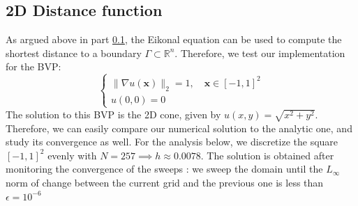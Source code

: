 \documentclass[11pt]{article}
\theoremstyle{definition}
\theoremstyle{remark}
\newcommand{\R}{\mathbb{R}}
\begin{document}
\subsection{2D Distance function}
As argued above in part \ref{}, the Eikonal equation can be used to compute the shortest distance to a boundary $\Gamma \subset \R^n$. Therefore, we test our implementation for the BVP:
\begin{equation}
\label{cone_bvp}
    \begin{cases}
        \|\nabla u(\textbf{x})\|_2=1 , \quad\textbf{x} \in[-1,1]^2\\
        u(0,0)=0
    \end{cases}
\end{equation}
The solution to this BVP is the 2D cone, given by $u(x,y)=\sqrt{x^2+y^2}$. Therefore, we can easily compare our numerical solution to the analytic one, and study its convergence as well.
For the analysis below, we discretize the square $[-1,1]^2$ evenly with $N=257 \implies h \approx 0.0078$. The solution is obtained after monitoring the convergence of the sweeps : we sweep the domain until the $L_{\infty}$ norm of change between the current grid and the previous one is less than $\epsilon=10^{-6}$
\end{document}
